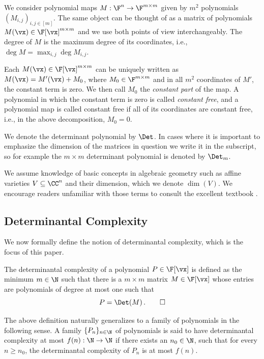 We consider polynomial maps $M : \F^n \to \F^{m \times m}$ given by $m^2$ polynomials $(M_{i,j})_{i,j\in [m]}$. The same object can be thought of as a matrix of polynomials $M(\vx) \in \F[\vx]^{m \times m}$ and we use both points of view interchangeably. The degree of $M$ is the maximum degree of its coordinates, i.e., $\deg M = \max_{i,j} \deg M_{i,j}$.

Each $M(\vx) \in \F[\vx]^{m \times m}$ can be uniquely written as $M(\vx) = M'(\vx) + M_0$, where $M_0 \in \F^{m \times m}$ and in all $m^2$ coordinates of $M'$, the constant term is zero. We then call $M_0$ the \emph{constant part} of the map. A polynomial in which the constant term is zero is called \emph{constant free}, and a polynomial map is called constant free if all of its coordinates are constant free, i.e., in the above decomposition, $M_0=0$.

We denote the determinant polynomial by $\Det$. In cases where it is important to emphasize the dimension of the matrices in question we write it in the subscript, so for example the $m \times m$ determinant polynomial is denoted by $\Det_m$.

We assume knowledge of basic concepts in algebraic geometry such as affine varieties $V \subseteq \CC^n$ and their dimension, which we denote $\dim(V)$. We encourage readers unfamiliar with those terms to consult the excellent textbook \cite{CLO07}. 

\subsection*{Determinantal Complexity}
We now formally define the notion of determinantal complexity, which is the focus of this paper. 
\begin{definition}
The determinantal complexity of a polynomial $P \in \F[\vx]$ is defined as the minimum $m \in \N$ such that there is a $m \times m$ matrix $M \in \F[\vx]$ whose entries are polynomials of degree at most one such that 
\[
P = \Det(M) \, . \qedhere
\]
\end{definition}
\begin{remark}
The above definition naturally generalizes to a family of polynomials in the following sense. A family  $\{P_n\}_{n\in \N}$ of polynomials is said to have determinantal complexity at most $f(n): \N \to \N$ if there exists an $n_0 \in \N$, such that for every $n \geq n_0$, the determinantal complexity of $P_n$ is at most $f(n)$. 
\end{remark}

